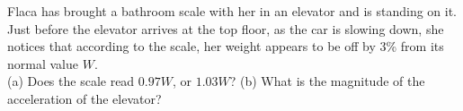 Flaca has brought a bathroom scale with her in an elevator and is standing on it.
Just before the elevator
arrives at the top floor, as the car is slowing down, she
notices that according to the scale, her weight appears to be off by 3\% from its normal value $W$.\\
%
(a) Does the scale read $0.97W$, or $1.03W$?\answercheck\hwendpart
%
(b) What is the magnitude of the acceleration of the elevator?\answercheck
